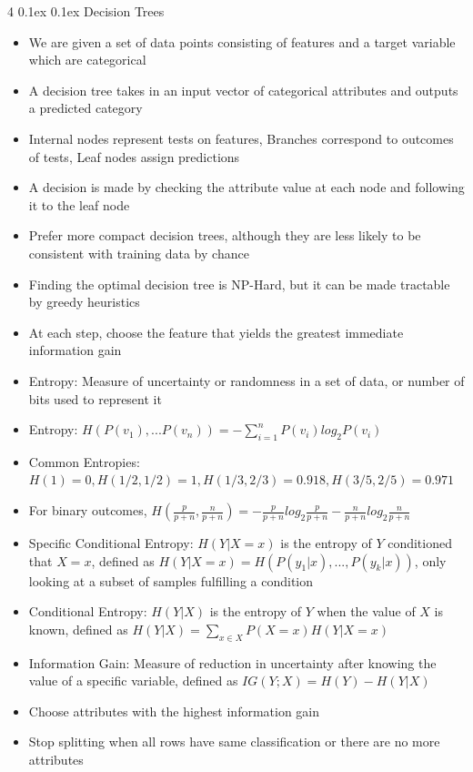 \documentclass[10pt, landscape]{article}
\makeatletter
\renewcommand{\subsection}{\@startsection{subsection}{2}{0mm}%
  {0.1ex} %
  {0.1ex} %
  {\normalfont\normalsize\bfseries}}
\makeatother
\begin{document}
\begin{multicols*}{4}
\subsection{Decision Trees}
\begin{itemize}
    \item We are given a set of data points consisting of features and a target variable which are categorical
    \item A decision tree takes in an input vector of categorical attributes and outputs a predicted category
    \item Internal nodes represent tests on features, Branches correspond to outcomes of tests, Leaf nodes assign predictions
    \item A decision is made by checking the attribute value at each node and following it to the leaf node
    \item Prefer more compact decision trees, although they are less likely to be consistent with training data by chance
    \item Finding the optimal decision tree is NP-Hard, but it can be made tractable by greedy heuristics
    \item At each step, choose the feature that yields the greatest immediate information gain
    \item Entropy: Measure of uncertainty or randomness in a set of data, or number of bits used to represent it
    \item Entropy: $H(P(v_1),...P(v_n))=-\sum_{i=1}^nP(v_i)log_2P(v_i)$
    \item Common Entropies: $H(1)=0, H(1/2, 1/2)=1, H(1/3, 2/3)=0.918, H(3/5, 2/5)=0.971$
    \item For binary outcomes, $H(\frac{p}{p+n},\frac{n}{p+n})=-\frac{p}{p+n}log_2\frac{p}{p+n}-\frac{n}{p+n}log_2\frac{n}{p+n}$
    \item Specific Conditional Entropy: $H(Y|X=x)$ is the entropy of $Y$ conditioned that $X=x$, defined as $H(Y|X=x)=H(P(y_1 | x),...,P(y_k|x))$, only looking at a subset of samples fulfilling a condition
    \item Conditional Entropy: $H(Y|X)$ is the entropy of $Y$ when the value of $X$ is known, defined as $H(Y|X)=\sum_{x \in X}P(X=x)H(Y|X=x)$
    \item Information Gain: Measure of reduction in uncertainty after knowing the value of a specific variable, defined as $IG(Y;X)=H(Y)-H(Y|X)$
    \item Choose attributes with the highest information gain
    \item Stop splitting when all rows have same classification or there are no more attributes

\end{itemize}
\end{multicols*}
\end{document}
